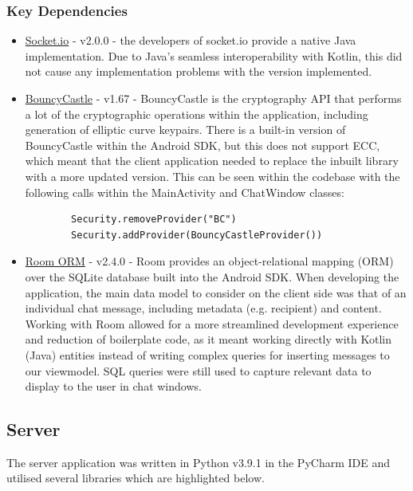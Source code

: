 \documentclass{mproj}
\begin{document}
\subsubsection{Key Dependencies}
\begin{itemize}
	\item \href{https://github.com/socketio/socket.io-client-java}{Socket.io} - v2.0.0 - the developers of socket.io provide a native Java implementation. Due to Java's seamless interoperability with Kotlin, this did not cause any implementation problems with the version implemented.
	\item \href{https://www.bouncycastle.org/}{BouncyCastle} - v1.67 - BouncyCastle is the cryptography API that performs a lot of the cryptographic operations within the application, including generation of elliptic curve keypairs. There is a built-in version of BouncyCastle within the Android SDK, but this does not support ECC, which meant that the client application needed to replace the inbuilt library with a more updated version. This can be seen within the codebase with the following calls within the MainActivity and ChatWindow classes:
		\begin{verbatim}
		Security.removeProvider("BC")
		Security.addProvider(BouncyCastleProvider())
		\end{verbatim}
	\item \href{https://github.com/furnivall/SEng_Final_Project}{Room ORM} - v2.4.0 - Room provides an object-relational mapping (ORM) over the SQLite database built into the Android SDK. When developing the application, the main data model to consider on the client side was that of an individual chat message, including metadata (e.g. recipient) and content. Working with Room allowed for a more streamlined development experience and reduction of boilerplate code, as it meant working directly with Kotlin (Java) entities instead of writing complex queries for inserting messages to our viewmodel. SQL queries were still used to capture relevant data to display to the user in chat windows. 

\end{itemize}

\subsection{Server}
The server application was written in Python v3.9.1 in the PyCharm IDE and utilised several libraries which are highlighted below. 
\end{document}
